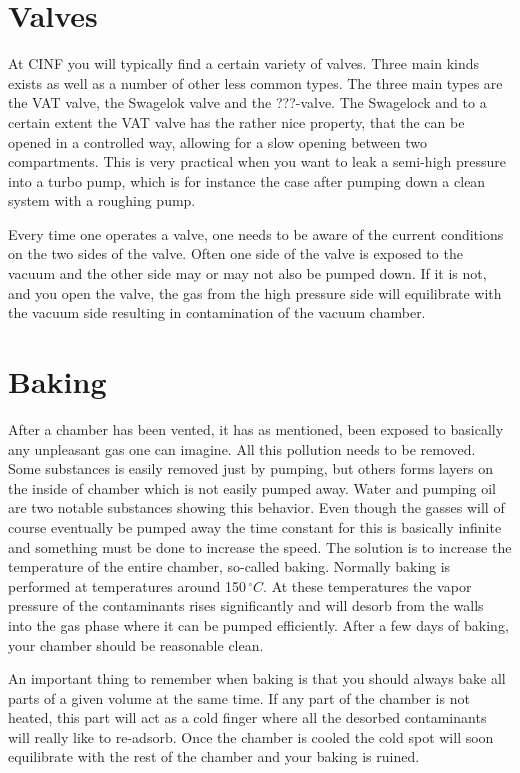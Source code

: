 \documentclass[a4paper,english]{article}
\begin{document}
\section{Valves}
At CINF you will typically find a certain variety of valves. Three main kinds exists as well as a number of other less common types. The three main types are the VAT valve, the Swagelok valve and the ???-valve. The Swagelock and to a certain extent the VAT valve has the rather nice property, that the can be opened in a controlled way, allowing for a slow opening between two compartments. This is very practical when you want to leak a semi-high pressure into a turbo pump, which is for instance the case after pumping down a clean system with a roughing pump.

Every time one operates a valve, one needs to be aware of the current conditions on the two sides of the valve. Often one side of the valve is exposed to the vacuum and the other side may or may not also be pumped down. If it is not, and you open the valve, the gas from the high pressure side will equilibrate with the vacuum side resulting in contamination of the vacuum chamber.

\section{Baking}
After a chamber has been vented, it has as mentioned, been exposed to basically any unpleasant gas one can imagine. All this pollution needs to be removed. Some substances is easily removed just by pumping, but others forms layers on the inside of chamber which is not easily pumped away. Water and pumping oil are two notable substances showing this behavior. Even though the gasses will of course eventually be pumped away the time constant for this is basically infinite and something must be done to increase the speed. The solution is to increase the temperature of the entire chamber, so-called baking. Normally baking is performed at temperatures around 150\,$^{\circ}C$. At these temperatures the vapor pressure of the contaminants rises significantly and will desorb from the walls into the gas phase where it can be pumped efficiently. After a few days of baking, your chamber should be reasonable clean.

An important thing to remember when baking is that you should always bake all parts of a given volume at the same time. If any part of the chamber is not heated, this part will act as a cold finger where all the desorbed contaminants will really like to re-adsorb. Once the chamber is cooled the cold spot will soon equilibrate with the rest of the chamber and your baking is ruined.

%
%

\end{document}

